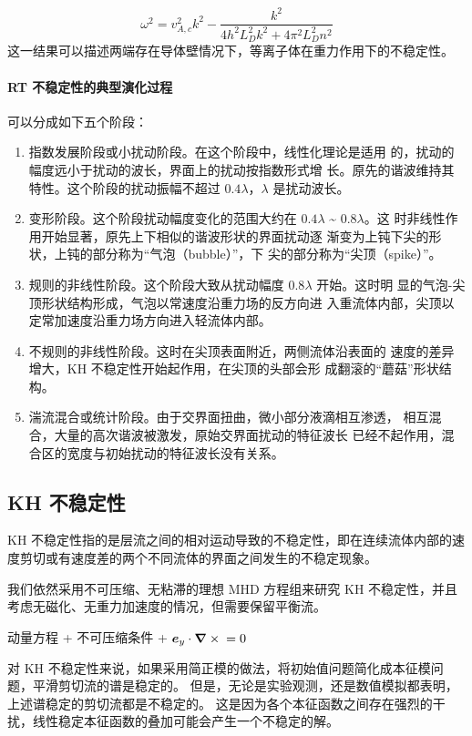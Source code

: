 \begin{equation}
\omega^2 = v_{A,c}^2 k^2 - \frac{ k^2}{4 h^2 L_D^2 k^2 + 4 \pi^2 L_D^2 n^2}
\end{equation}
这一结果可以描述两端存在导体壁情况下，等离子体在重力作用下的不稳定性。

\paragraph{RT 不稳定性的典型演化过程}
可以分成如下五个阶段：
\begin{enumerate}
\item 指数发展阶段或小扰动阶段。在这个阶段中，线性化理论是适用
的，扰动的幅度远小于扰动的波长，界面上的扰动按指数形式增
长。原先的谐波维持其特性。这个阶段的扰动振幅不超过 $0.4\lambda$，$\lambda$
是扰动波长。
\item 变形阶段。这个阶段扰动幅度变化的范围大约在 $0.4\lambda$ \~{} $0.8\lambda$。这
时非线性作用开始显著，原先上下相似的谐波形状的界面扰动逐
渐变为上钝下尖的形状，上钝的部分称为“气泡（bubble）”，下
尖的部分称为“尖顶（spike）”。
\item 规则的非线性阶段。这个阶段大致从扰动幅度 $0.8\lambda$ 开始。这时明
显的气泡-尖顶形状结构形成，气泡以常速度沿重力场的反方向进
入重流体内部，尖顶以定常加速度沿重力场方向进入轻流体内部。
\item 不规则的非线性阶段。这时在尖顶表面附近，两侧流体沿表面的
速度的差异增大，KH 不稳定性开始起作用，在尖顶的头部会形
成翻滚的“蘑菇”形状结构。
\item 湍流混合或统计阶段。由于交界面扭曲，微小部分液滴相互渗透，
相互混合，大量的高次谐波被激发，原始交界面扰动的特征波长
已经不起作用，混合区的宽度与初始扰动的特征波长没有关系。
\end{enumerate}

\subsection{KH 不稳定性}

KH 不稳定性指的是层流之间的相对运动导致的不稳定性，即在连续流体内部的速度剪切或有速度差的两个不同流体的界面之间发生的不稳定现象。

我们依然采用不可压缩、无粘滞的理想 MHD 方程组来研究 KH 不稳定性，并且考虑无磁化、无重力加速度的情况，但需要保留平衡流。

动量方程 + 不可压缩条件 + $\bm{e}_y \cdot \bm{\nabla} \times{} = 0$

对 KH 不稳定性来说，如果采用简正模的做法，将初始值问题简化成本征模问题，平滑剪切流的谱是稳定的。
但是，无论是实验观测，还是数值模拟都表明，上述谱稳定的剪切流都是不稳定的。
这是因为各个本征函数之间存在强烈的干扰，线性稳定本征函数的叠加可能会产生一个不稳定的解。

